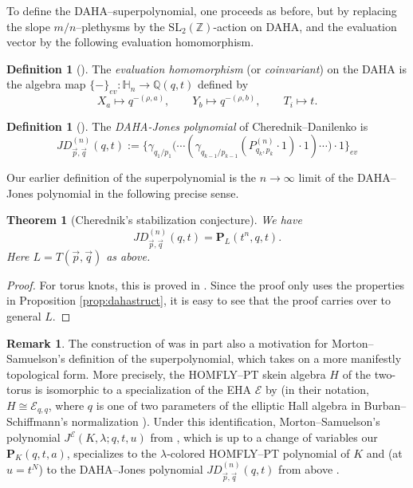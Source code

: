 \documentclass{amsart}
\numberwithin{equation}{section}
\newtheorem{theorem}[lemma]{Theorem}%
\theoremstyle{definition}
\newtheorem{remark}[lemma]{Remark}%
\newtheorem{definition}[lemma]{Definition}%
\def\hat{\widehat}
\def\SL{{\mathrm{SL}}}
\DeclareMathOperator{\SH}{\mathbb{SH}}
\newcommand{\cE}{\mathcal{E}}
\newcommand{\fv}{\mathfrak{v}}
\newcommand{\Z}{{\mathbb Z}}
\newcommand{\Q}{{\mathbb Q}}
\newcommand{\HH}{\mathbb{H}}
\newcommand{\fqrs}{\hat{\mathbf{f}}_{\vec{p},\vec{q}}}
\begin{document}
To define the DAHA--superpolynomial, one proceeds as before, but by replacing the slope $m/n$--plethysms by the $\SL_2(\Z)$-action on DAHA, and the evaluation vector by the following evaluation homomorphism.
\begin{definition}[\cite{CD}]\label{def:dahaeval}
The {\em evaluation homomorphism} (or {\em coinvariant}) on the DAHA is the algebra map $\{-\}_{ev}: \HH_n\to \Q(q,t)$ defined by
$$X_a\mapsto q^{-(\rho,a)}, \qquad Y_b\mapsto q^{-(\rho,b)}, \qquad T_i\mapsto t.$$
\end{definition}

\begin{definition}[]\label{def:dahajones}
The {\em DAHA-Jones polynomial} of Cherednik--Danilenko is
\begin{equation}\label{eq:dahajones}
JD^{(n)}_{\vec{p},\vec{q}}(q,t):=\bigl\{\gamma_{q_1/p_1}\bigl(\cdots(\gamma_{q_{k-1}/p_{k-1}}(P_{q_k,p_k}^{(n)}\cdot 1)\cdot 1)\cdots\bigr)\cdot 1\bigr\}_{ev}
\end{equation}
\end{definition}

Our earlier definition of the superpolynomial is the $n\to \infty$ limit of the DAHA--Jones polynomial in the following precise sense.
\begin{theorem}[Cherednik's stabilization conjecture]\label{thm:cherednik-stab}
We have
$$JD^{(n)}_{\vec{p},\vec{q}}(q,t)=\mathbf{P}_L(t^n,q,t).$$
Here $L=T(\vec{p},\vec{q})$ as above.
\end{theorem}
\begin{proof}
For torus knots, this is proved in \protect\cite[Section 3.4]{GN}. Since the proof only uses the properties in Proposition \ref{prop:dahastruct}, it is easy to see that the proof carries over to general $L$.
\end{proof}
\begin{remark}\label{rmk:homfly}
The construction of \cite{CD} was in part also a motivation for Morton--Samuelson's definition of the superpolynomial, which takes on a more manifestly topological form.
More precisely, the HOMFLY--PT skein algebra $H$ of the two-torus is isomorphic to a specialization of the EHA $\cE$ by \cite[Theorem 3]{MS} (in their notation, $H \cong \cE_{q,q}$, where $q$ is one of two parameters of the elliptic Hall algebra in Burban--Schiffmann's normalization \cite{BS1}). Under this identification, Morton--Samuelson's polynomial $J^\cE(K, \lambda; q, t, u)$ from \cite[Definition 7.15]{MS}, which is up to a change of variables our $\mathbf{P}_K(q,t,a)$, specializes to the $\lambda$-colored HOMFLY--PT polynomial of $K$ and (at $u = t^N$) to the DAHA--Jones polynomial $JD^{(n)}_{\vec{p},\vec{q}}(q,t)$ from above \cite[Theorem 7.4]{MS}. 
\end{remark}
\end{document}
